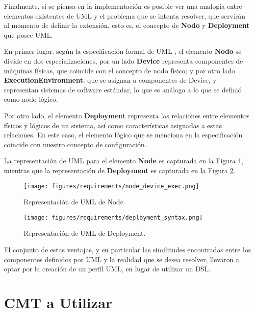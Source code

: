 Finalmente, si se piensa en la implementación es posible ver una analogía entre elementos existentes de UML y el problema que se intenta resolver, que servirán al momento de definir la extensión, esto es, el concepto de \textbf{Nodo} y \textbf{Deployment} que posee UML. 

En primer lugar, según la especificación formal de UML \cite{UML}, el elemento \textbf{Nodo} se divide en dos especializaciones, por un lado \textbf{Device} representa componentes de máquinas físicas, que coincide con el concepto de nodo físico; y por otro lado \textbf{ExecutionEnvironment}, que se asignan a componentes de Device, y representan sistemas de software estándar, lo que es análogo a lo que se definió como nodo lógico. 

Por otro lado, el elemento \textbf{Deployment} representa las relaciones entre elementos físicos y lógicos de un sistema, así como características asignadas a estas relaciones. En este caso, el elemento lógico que se menciona en la especificación coincide con nuestro concepto de configuración.

La representación de UML para el elemento \textbf{Node} es capturada en la Figura \ref{fig:requirements:uml_node}, mientras que la representación de \textbf{Deployment} es capturada en la Figura \ref{fig:requirements:uml_deployment}.

\begin{figure}[H]
    \centering
    \texttt{[image: figures/requirements/node\_device\_exec.png]}
    \caption{Representación de UML de Node.}
    \label{fig:requirements:uml_node}
\end{figure}

\begin{figure}[H]
    \centering
    \texttt{[image: figures/requirements/deployment\_syntax.png]}
    \caption{Representación de UML de Deployment.}
    \label{fig:requirements:uml_deployment}
\end{figure}


El conjunto de estas ventajas, y en particular las similitudes encontradas entre los componentes definidos por UML y la realidad que se desea resolver, llevaron a optar por la creación de un perfil UML, en lugar de utilizar un DSL.

\section{CMT a Utilizar}\label{CMT a utilizar}

